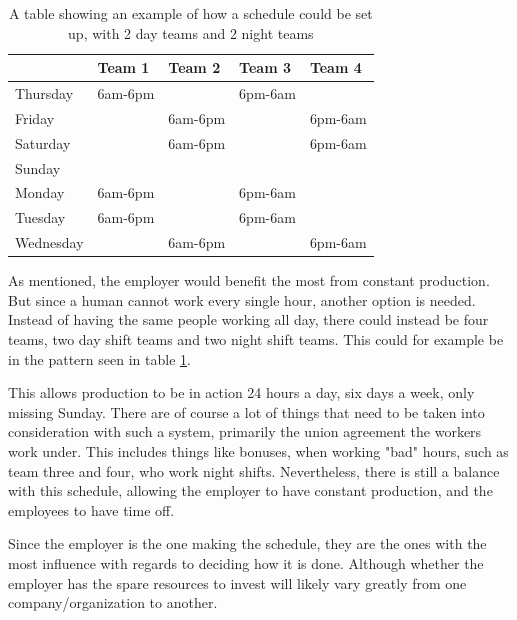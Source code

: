 \begin{table}[ht!]
    \centering
    \begin{tabular}{lllll}
        \toprule
                  & Team 1  & Team 2  & Team 3  & Team 4  \\
                  \midrule
        Thursday  & 6am-6pm &         & 6pm-6am &         \\
        Friday    &         & 6am-6pm &         & 6pm-6am \\
        Saturday  &         & 6am-6pm &         & 6pm-6am \\
        Sunday    &         &         &         &         \\
        Monday    & 6am-6pm &         & 6pm-6am &         \\
        Tuesday   & 6am-6pm &         & 6pm-6am &         \\
        Wednesday &         & 6am-6pm &         & 6pm-6am \\
        \bottomrule
    \end{tabular}
    \caption{A table showing an example of how a schedule could be set up, with 2 day teams and 2 night teams}
    \label{tab:exampleSchedule}
\end{table}

As mentioned, the employer would benefit the most from constant production. But since a human cannot work every single hour, another option is needed. Instead of having the same people working all day, there could instead be four teams, two day shift teams and two night shift teams. This could for example be in the pattern seen in table \ref{tab:exampleSchedule}.

This allows production to be in action 24 hours a day, six days a week, only missing Sunday. There are of course a lot of things that need to be taken into consideration with such a system, primarily the union agreement the workers work under. This includes things like bonuses, when working "bad" hours, such as team three and four, who work night shifts. Nevertheless, there is still a balance with this schedule, allowing the employer to have constant production, and the employees to have time off.

Since the employer is the one making the schedule, they are the ones with the most influence with regards to deciding how it is done. Although whether the employer has the spare resources to invest will likely vary greatly from one company/organization to another.


